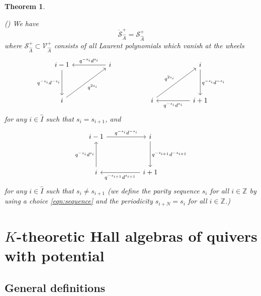 \documentclass{amsart}
\newtheorem{theorem}[subsection]{Theorem}
\def\BZ{{\mathbb{Z}}}
\def\CS{{\mathcal{S}}}
\def\CV{{\mathcal{V}}}
\def\oCS{\mathring{\CS}}
\begin{document}
\medskip 

\begin{theorem}
\label{thm:wa 2}
	
(\cite{N Red}) We have
\[
\oCS^+_{\widehat{A}} = \CS^+_{\widehat{A}}
\]
where $\CS^+_{\widehat{A}} \subset \CV^+_{\widehat{A}}$ consists of all Laurent polynomials which vanish at the wheels
\begin{equation}
\label{eqn:wheel affine even}
\begin{tikzcd}
i-1 && i &&&& i \\ \\
i &&&& i && i+1
\arrow["{q^{-s_{i}}d^{-s_{i}}}"', from=1-1, to=3-1]
\arrow["{q^{-s_i}d^{s_i}}"', from=1-3, to=1-1]
\arrow["{q^{-s_i}d^{-s_i}}", from=1-7, to=3-7]
\arrow["{q^{2s_i}}"', from=3-1, to=1-3]
\arrow["{q^{2s_i}}", from=3-5, to=1-7]
\arrow["{q^{-s_i}d^{s_i}}", from=3-7, to=3-5]
\end{tikzcd}	
\end{equation}
for any $i \in \hat{I}$ such that $s_i = s_{i+1}$, and
\begin{equation}
\label{eqn:wheel affine odd}
\begin{tikzcd}
i-1 && i \\ \\
i && i+1
\arrow["{q^{-s_i}d^{-s_i}}", from=1-1, to=1-3]
\arrow["{q^{-s_{i+1}}d^{-s_{i+1}}}", from=1-3, to=3-3]
\arrow["{q^{-s_i}d^{s_i}}", from=3-1, to=1-1]
\arrow["{q^{-s_{i+1}}d^{s_{i+1}}}", from=3-3, to=3-1]
\end{tikzcd}
\end{equation}
for any $i \in \hat{I}$ such that $s_i \neq s_{i+1}$ (we define the parity sequence $s_i$ for all $i \in \BZ$ by using a choice \eqref{eqn:sequence} and the periodicity $s_{i+N} = s_i$ for all $i \in \BZ$.)
\end{theorem}

\bigskip

\section{$K$-theoretic Hall algebras of quivers with potential}
\label{sec:geometry}

\medskip 

\subsection{General definitions}
\label{sub:general}
\end{document}
